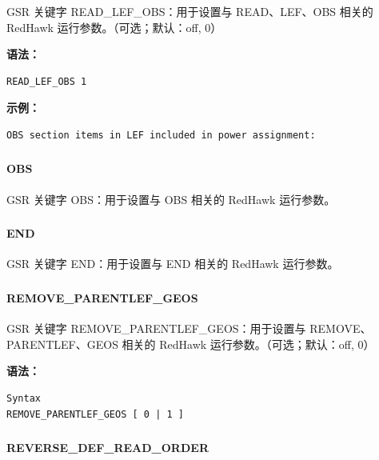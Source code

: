 GSR 关键字 READ_LEF_OBS：用于设置与 READ、LEF、OBS 相关的 RedHawk 运行参数。（可选；默认：off, 0）

\textbf{语法：}
\begin{lstlisting}
READ_LEF_OBS 1
\end{lstlisting}

\textbf{示例：}
\begin{lstlisting}
OBS section items in LEF included in power assignment:
\end{lstlisting}

\subsubsection{}
\paragraph*{OBS}

GSR 关键字 OBS：用于设置与 OBS 相关的 RedHawk 运行参数。

\subsubsection{}
\paragraph*{END}

GSR 关键字 END：用于设置与 END 相关的 RedHawk 运行参数。

\subsubsection{}
\paragraph*{REMOVE_PARENTLEF_GEOS}

GSR 关键字 REMOVE_PARENTLEF_GEOS：用于设置与 REMOVE、PARENTLEF、GEOS 相关的 RedHawk 运行参数。（可选；默认：off, 0）

\textbf{语法：}
\begin{lstlisting}
Syntax
REMOVE_PARENTLEF_GEOS [ 0 | 1 ]
\end{lstlisting}

\subsubsection{}
\paragraph*{REVERSE_DEF_READ_ORDER}

